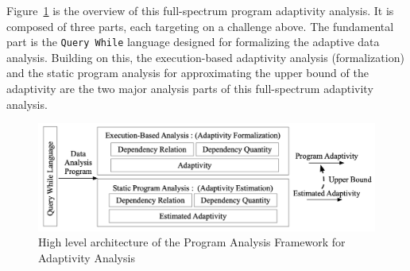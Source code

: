 

Figure~\ref{fig:structure} is the overview of this full-spectrum program adaptivity analysis.
It is composed of three parts, each targeting on a challenge above.
The fundamental part is the {\tt Query While} language designed for formalizing the 
adaptive data analysis. Building on this, 
the execution-based adaptivity analysis (formalization)
and the static program analysis for approximating the upper bound of the 
adaptivity are the two major analysis parts of this full-spectrum adaptivity analysis.
\begin{figure}
   \centering   
   \includegraphics[width=1.0\textwidth]{figures/overview.png}
  \caption{High level architecture of the Program Analysis Framework for Adaptivity Analysis}
   \label{fig:structure}
\end{figure}